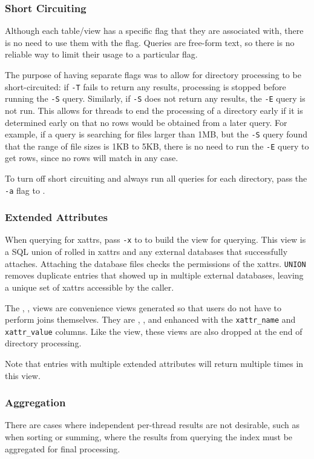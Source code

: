 \subsubsection{Short Circuiting}
Although each table/view has a specific flag that they are associated
with, there is no need to use them with the flag. Queries are
free-form text, so there is no reliable way to limit their usage to a
particular flag.

The purpose of having separate flags was to allow for directory
processing to be short-circuited: if \texttt{-T} fails to return any
results, processing is stopped before running the \texttt{-S}
query. Similarly, if \texttt{-S} does not return any results, the
\texttt{-E} query is not run. This allows for threads to end the
processing of a directory early if it is determined early on that no
rows would be obtained from a later query. For example, if a query is
searching for files larger than 1MB, but the \texttt{-S} query found
that the range of file sizes is 1KB to 5KB, there is no need to run
the \texttt{-E} query to get rows, since no rows will match in any
case.

To turn off short circuiting and always run all queries for each
directory, pass the \texttt{-a} flag to \gufiquery.

\subsubsection{Extended Attributes}
When querying for xattrs, pass \texttt{-x} to \gufiquery to build the
\xattrs view for querying. This view is a SQL union of rolled in
xattrs and any external databases that successfully
attaches. Attaching the database files checks the permissions of the
xattrs. \texttt{UNION} removes duplicate entries that showed up in
multiple external databases, leaving a unique set of xattrs accessible
by the caller.

The \xentries, \xpentries, \xsummary views are convenience views
generated so that users do not have to perform joins themselves. They
are \entries, \pentries, and \summary enhanced with the
\texttt{xattr\_name} and \texttt{xattr\_value} columns. Like the
\xattrs view, these views are also dropped at the end of directory
processing.

Note that entries with multiple extended attributes will return
multiple times in this view.

\subsubsection{Aggregation}
There are cases where independent per-thread results are not
desirable, such as when sorting or summing, where the results from
querying the index must be aggregated for final processing.


